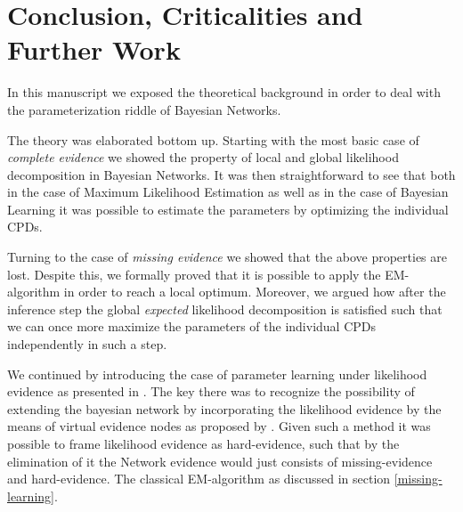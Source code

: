 \documentclass[11pt]{article}
\begin{document}
\begin{article}
\begin{algorithm*}[h!]
\begin{multicols}{2}
\begin{algorithmic}[1]
{\EndWhile
\EndProcedure

\end{algorithmic}
\end{multicols}
\end{algorithm*}

\newpage

\section{Conclusion, Criticalities and Further Work}
\label{criticalities}
In this manuscript we exposed the theoretical background in order
to deal with the parameterization riddle of Bayesian Networks.

The theory was elaborated bottom up. Starting with the most basic
case of \emph{complete evidence} we showed the property of local and
global likelihood decomposition in Bayesian Networks. It was then
straightforward to see that both in the case of Maximum Likelihood
Estimation as well as in the case of Bayesian Learning it was
possible to estimate the parameters by optimizing the individual
CPDs.

Turning to the case of \emph{missing evidence} we showed that the above
properties are lost. Despite this, we formally proved that it is
possible to apply the EM-algorithm in order to reach a local
optimum. Moreover, we argued how after the inference step the global
\emph{expected} likelihood decomposition is satisfied such that we can
once more maximize the parameters of the individual CPDs
independently in such a step.

We continued by introducing the case of parameter learning under
likelihood evidence as presented in \cite{Wasserkrug_all}. The key
there was to recognize the possibility of extending the bayesian
network by incorporating the likelihood evidence by the means of
virtual evidence nodes as proposed by
\cite{pearl1987evidential}. Given such a method it was possible to
frame likelihood evidence as hard-evidence, such that by the
elimination of it the Network evidence would just consists of
missing-evidence and hard-evidence. The classical EM-algorithm as
discussed in section \ref{missing-learning}.


\end{article}
\end{document}
